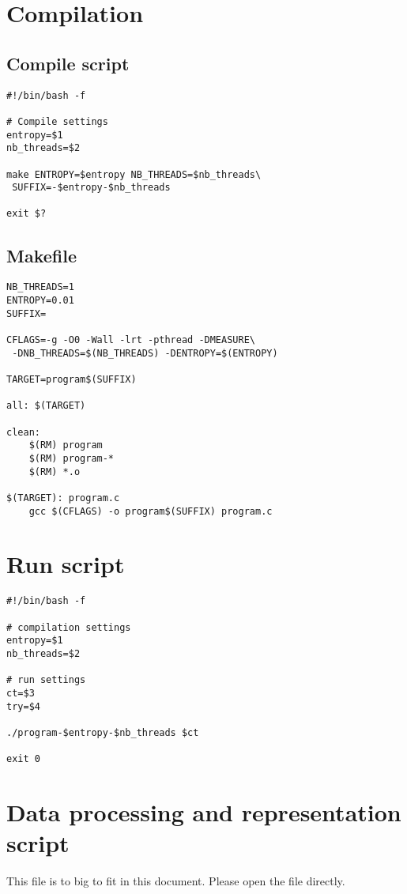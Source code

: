 \section{Compilation}
\label{app:compile}

\subsection{Compile script}
\begin{lstlisting}
#!/bin/bash -f

# Compile settings
entropy=$1
nb_threads=$2

make ENTROPY=$entropy NB_THREADS=$nb_threads\
 SUFFIX=-$entropy-$nb_threads

exit $?

\end{lstlisting}

\subsection{Makefile}
\label{app:makefile}
\begin{lstlisting}
NB_THREADS=1
ENTROPY=0.01
SUFFIX=

CFLAGS=-g -O0 -Wall -lrt -pthread -DMEASURE\
 -DNB_THREADS=$(NB_THREADS) -DENTROPY=$(ENTROPY)

TARGET=program$(SUFFIX)

all: $(TARGET)

clean:
	$(RM) program
	$(RM) program-*
	$(RM) *.o
	
$(TARGET): program.c
	gcc $(CFLAGS) -o program$(SUFFIX) program.c
\end{lstlisting}

\section{Run script}
\label{app:run}
\begin{lstlisting}
#!/bin/bash -f

# compilation settings
entropy=$1
nb_threads=$2

# run settings
ct=$3
try=$4

./program-$entropy-$nb_threads $ct

exit 0
\end{lstlisting}

\section{Data processing and representation script}
\label{app:process}
This file is to big to fit in this document. Please open the file directly.

